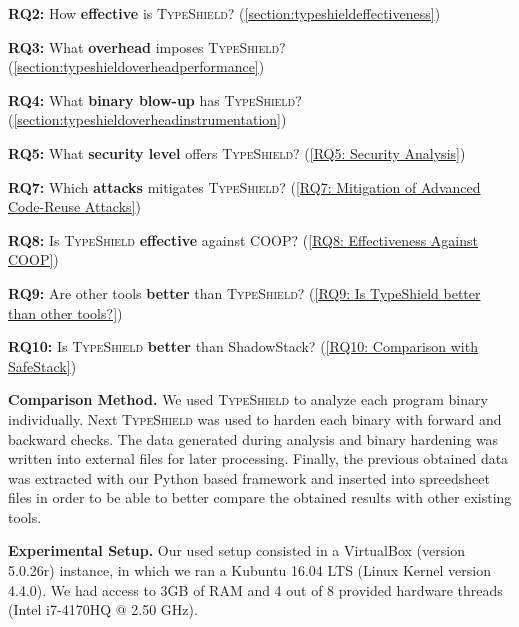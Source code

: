 \hspace{-.27cm}
\textbf{RQ2:} How \textbf{effective} is \textsc{TypeShield}? (\cref{section:typeshieldeffectiveness})

\hspace{-.27cm}
\textbf{RQ3:} What \textbf{overhead} imposes \textsc{TypeShield}? (\cref{section:typeshieldoverheadperformance})

\hspace{-.27cm}
\textbf{RQ4:} What \textbf{binary blow-up} has \textsc{TypeShield}? (\cref{section:typeshieldoverheadinstrumentation})

\hspace{-.27cm}
\textbf{RQ5:} What \textbf{security level} offers \textsc{TypeShield}? (\cref{RQ5: Security Analysis})


\hspace{-.27cm}
\textbf{RQ7:} Which \textbf{attacks} mitigates \textsc{TypeShield}? (\cref{RQ7: Mitigation of Advanced Code-Reuse Attacks})

\hspace{-.27cm}
\textbf{RQ8:} Is \textsc{TypeShield} \textbf{effective} against COOP? (\cref{RQ8: Effectiveness Against COOP})

\hspace{-.27cm}
\textbf{RQ9:} Are other tools \textbf{better} than \textsc{TypeShield}? (\cref{RQ9: Is TypeShield better than other tools?})

\hspace{-.25cm}
\textbf{RQ10:} Is \textsc{TypeShield} \textbf{better} than ShadowStack? (\cref{RQ10: Comparison with SafeStack})

\textbf{Comparison Method.} We used \textsc{TypeShield} to analyze each program binary individually. Next \textsc{TypeShield} was used to harden each binary with forward and 
backward checks. The data generated during analysis and binary hardening was written into external files for later processing. Finally, the previous obtained 
data was extracted with our Python based framework and inserted into spreedsheet files in order to be able to better compare the obtained 
results with other existing tools.

\textbf{Experimental Setup.} Our used setup consisted in a VirtualBox (version 5.0.26r) instance, in which we ran a Kubuntu 16.04 LTS (Linux Kernel
version 4.4.0). We had access to 3GB of RAM and 4 out of 8 provided hardware threads (Intel i7-4170HQ @ 2.50 GHz).

